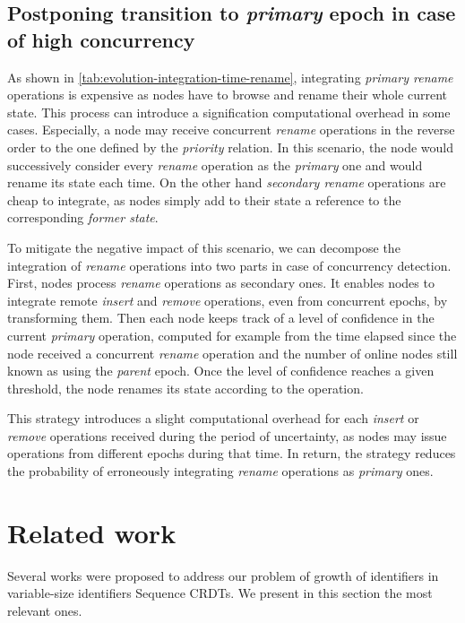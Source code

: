\documentclass[10pt,journal,compsoc]{IEEEtran}
\begin{document}
\subsection{Postponing transition to \emph{primary} epoch in case of high concurrency}
\label{sec:postponing-transition-to-new-epoch}

As shown in \autoref{tab:evolution-integration-time-rename}, integrating \emph{primary rename} operations is expensive as nodes have to browse and rename their whole current state.
This process can introduce a signification computational overhead in some cases.
Especially, a node may receive concurrent \emph{rename} operations in the reverse order to the one defined by the \emph{priority} relation.
In this scenario, the node would successively consider every \emph{rename} operation as the \emph{primary} one and would rename its state each time.
On the other hand \emph{secondary rename} operations are cheap to integrate, as nodes simply add to their state a reference to the corresponding \emph{former state}.

To mitigate the negative impact of this scenario, we can decompose the integration of \emph{rename} operations into two parts in case of concurrency detection.
First, nodes process \emph{rename} operations as secondary ones.
It enables nodes to integrate remote \emph{insert} and \emph{remove} operations, even from concurrent epochs, by transforming them.
Then each node keeps track of a level of confidence in the current \emph{primary} operation, computed for example from the time elapsed since the node received a concurrent \emph{rename} operation and the number of online nodes still known as using the \emph{parent} epoch.
Once the level of confidence reaches a given threshold, the node renames its state according to the operation.

This strategy introduces a slight computational overhead for each \emph{insert} or \emph{remove} operations received during the period of uncertainty, as nodes may issue operations from different epochs during that time.
In return, the strategy reduces the probability of erroneously integrating \emph{rename} operations as \emph{primary} ones.

\section{Related work}

Several works were proposed to address our problem of growth of identifiers in variable-size identifiers Sequence \acp{CRDT}.
We present in this section the most relevant ones.
\end{document}

